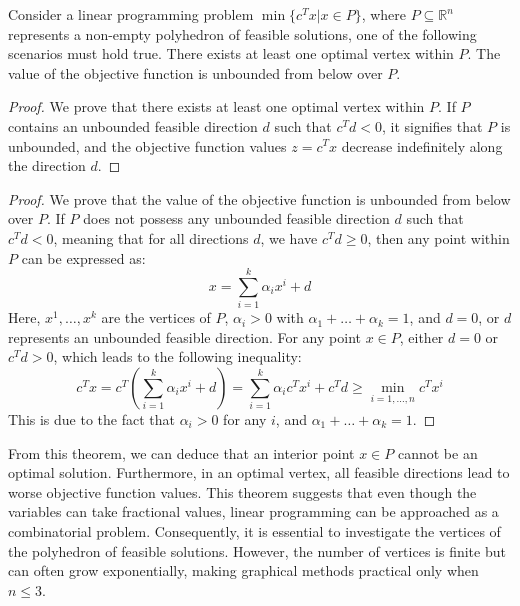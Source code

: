 \begin{theorem}
    Consider a linear programming problem $\min\{c^Tx|x \in P\}$, where $P \subseteq \mathbb{R}^n$ represents a non-empty polyhedron of feasible solutions, one of the following scenarios must hold true.
    There exists at least one optimal vertex within $P$.
    The value of the objective function is unbounded from below over $P$.
\end{theorem}
\begin{proof}
    We prove that there exists at least one optimal vertex within $P$.
    If $P$ contains an unbounded feasible direction $d$ such that $c^Td < 0$, it signifies that $P$ is unbounded, and the objective function values $z=c^Tx$ decrease indefinitely along the direction $d$. 
\end{proof}
\begin{proof}
    We prove that the  value of the objective function is unbounded from below over $P$.
    If $P$ does not possess any unbounded feasible direction $d$ such that $c^Td < 0$, meaning that for all directions $d$, we have $c^Td \geq 0$, then any point within $P$ can be expressed as: 
    \[x=\sum_{i=1}^k{\alpha_ix^i + d}\]
    Here, $x^1,\dots,x^k$ are the vertices of $P$, $\alpha_i > 0$ with $\alpha_1+\dots+\alpha_k=1$, and $d = 0$, or $d$ represents an unbounded feasible direction.
    For any point $x \in P$, either $d = 0$ or $c^Td > 0$, which leads to the following inequality:
    \[c^Tx=c^T\left(\sum_{i=1}^{k}{\alpha_ix^i+d}\right)=\sum_{i=1}^{k}{\alpha_ic^Tx^i+c^Td}\geq\min_{i=1,\dots,n}{c^Tx^i}\]
    This is due to the fact that $\alpha_i > 0$ for any $i$, and $\alpha_1+\dots+\alpha_k=1$. 
\end{proof}
From this theorem, we can deduce that an interior point $x \in P$ cannot be an optimal solution. 
Furthermore, in an optimal vertex, all feasible directions lead to worse objective function values.
This theorem suggests that even though the variables can take fractional values, linear programming can be approached as a combinatorial problem.
Consequently, it is essential to investigate the vertices of the polyhedron of feasible solutions.
However, the number of vertices is finite but can often grow exponentially, making graphical methods practical only when $n \leq 3$. 
